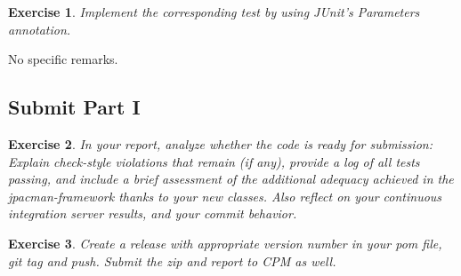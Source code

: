 \documentclass[a4paper]{article}
\newtheorem{thm}{Exercise}
\begin{document}
    \begin{thm}
      Implement the corresponding test by using JUnit’s Parameters annotation.
    \end{thm}
    No specific remarks.
    
  
  \subsection{Submit Part I}
    \begin{thm}
      In your report, analyze whether the code is ready for submission: Explain check-style violations that remain (if any), provide a log of all tests passing, and include a brief assessment of the additional adequacy achieved in the jpacman-framework thanks to your new classes. Also reflect on your continuous integration server results, and your commit behavior.
    \end{thm}
    
    
    \begin{thm}
      Create a release with appropriate version number in your pom file, git tag and push. Submit the zip and report to CPM as well.
    \end{thm}
    
\end{document}

